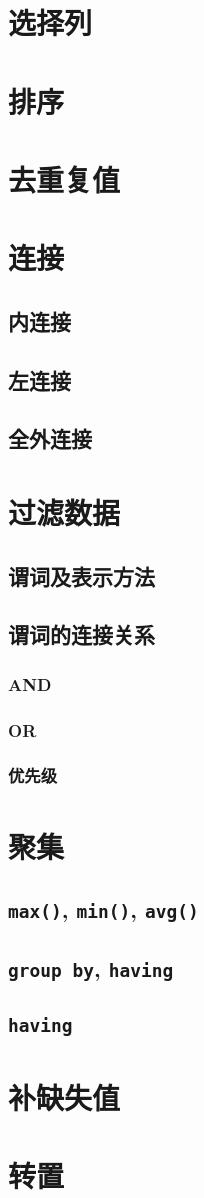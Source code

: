 \documentclass[12pt]{article}
\newcommand{\id}[1]{\texttt{#1}}
\newcommand{\kw}[1]{\texttt{\textbf{#1}}}
\begin{document}
\section{选择列}
\section{排序}
\section{去重复值}
\section{连接}
\subsection{内连接}
\subsection{左连接}
\subsection{全外连接}
\section{过滤数据}
\subsection{谓词及表示方法}
\subsection{谓词的连接关系}
\subsubsection{AND}
\subsubsection{OR}
\subsubsection{优先级}
\section{聚集}
\subsection{\id{max()}, \id{min()}, \id{avg()}}
\subsection{\kw{group by}, \kw{having}}
\subsection{\kw{having}}
\section{补缺失值}

\section{转置}
\end{document}
